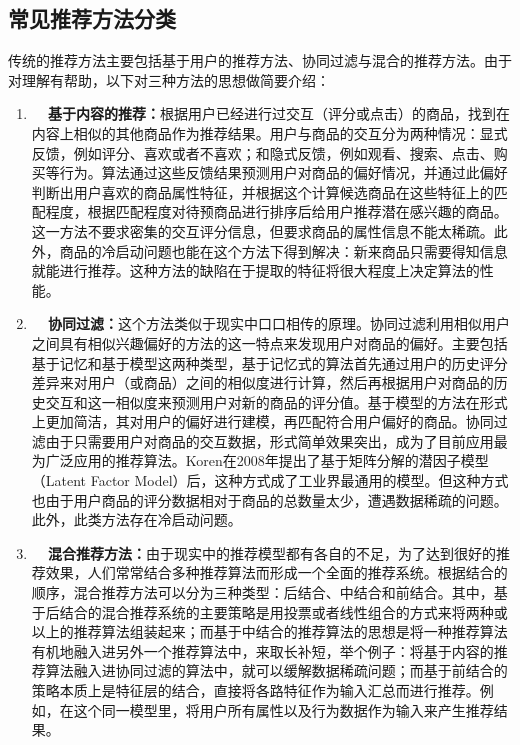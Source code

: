 \subsection{常见推荐方法分类}
传统的推荐方法主要包括基于用户的推荐方法、协同过滤与混合的推荐方法。由于对理解有帮助，以下对三种方法的思想做简要介绍：
\begin{enumerate}
    \item \textbf{~~基于内容的推荐：}根据用户已经进行过交互（评分或点击）的商品，找到在内容上相似的其他商品作为推荐结果。用户与商品的交互分为两种情况：显式反馈，例如评分、喜欢或者不喜欢；和隐式反馈，例如观看、搜索、点击、购买等行为。算法通过这些反馈结果预测用户对商品的偏好情况，并通过此偏好判断出用户喜欢的商品属性特征，并根据这个计算候选商品在这些特征上的匹配程度，根据匹配程度对待预商品进行排序后给用户推荐潜在感兴趣的商品。这一方法不要求密集的交互评分信息，但要求商品的属性信息不能太稀疏。此外，商品的冷启动问题也能在这个方法下得到解决：新来商品只需要得知信息就能进行推荐。这种方法的缺陷在于提取的特征将很大程度上决定算法的性能。

    \item \textbf{~~协同过滤：}这个方法类似于现实中口口相传的原理。协同过滤利用相似用户之间具有相似兴趣偏好的方法的这一特点来发现用户对商品的偏好。主要包括基于记忆和基于模型这两种类型，基于记忆式的算法首先通过用户的历史评分差异来对用户（或商品）之间的相似度进行计算，然后再根据用户对商品的历史交互和这一相似度来预测用户对新的商品的评分值。基于模型的方法在形式上更加简洁，其对用户的偏好进行建模，再匹配符合用户偏好的商品。协同过滤由于只需要用户对商品的交互数据，形式简单效果突出，成为了目前应用最为广泛应用的推荐算法。Koren在2008年提出了基于矩阵分解的潜因子模型（Latent Factor Model）后，这种方式成了工业界最通用的模型。但这种方式也由于用户商品的评分数据相对于商品的总数量太少，遭遇数据稀疏的问题。此外，此类方法存在冷启动问题。

    \item \textbf{~~混合推荐方法：}由于现实中的推荐模型都有各自的不足，为了达到很好的推荐效果，人们常常结合多种推荐算法而形成一个全面的推荐系统。根据结合的顺序，混合推荐方法可以分为三种类型：后结合、中结合和前结合。其中，基于后结合的混合推荐系统的主要策略是用投票或者线性组合的方式来将两种或以上的推荐算法组装起来；而基于中结合的推荐算法的思想是将一种推荐算法有机地融入进另外一个推荐算法中，来取长补短，举个例子：将基于内容的推荐算法融入进协同过滤的算法中，就可以缓解数据稀疏问题；而基于前结合的策略本质上是特征层的结合，直接将各路特征作为输入汇总而进行推荐。例如，在这个同一模型里，将用户所有属性以及行为数据作为输入来产生推荐结果。
\end{enumerate}

